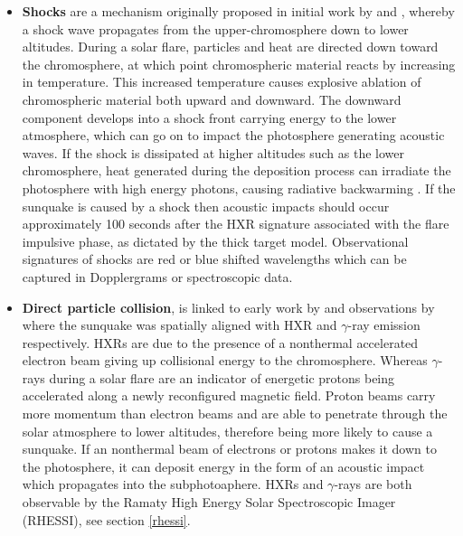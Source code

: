 \begin{itemize}
\item \textbf{Shocks} are a mechanism originally proposed in initial work by \cite{1995ESASP.376b.341K} and \cite{1998Natur.393..317K}, whereby a shock wave propagates from the upper-chromosphere down to lower altitudes. During a solar flare, particles and heat are directed down toward the chromosphere, at which point chromospheric material reacts by increasing in temperature. This increased temperature causes explosive ablation of chromospheric material both upward and downward. The downward component develops into a shock front carrying energy to the lower atmosphere, which can go on to impact the photosphere generating acoustic waves. If the shock is dissipated at higher altitudes such as the lower chromosphere, heat generated during the deposition process can irradiate the photosphere with high energy photons, causing radiative backwarming \citep{1989SoPh..124..303M}. If the sunquake is caused by a shock then acoustic impacts should occur approximately 100 seconds after the HXR signature associated with the flare impulsive phase, as dictated by the thick target model. Observational signatures of shocks are red or blue shifted wavelengths which can be captured in Dopplergrams or spectroscopic data. \\

\item \textbf{Direct particle collision}, is linked to early work by \cite{1998Natur.393..317K} and observations by \cite{2007ApJ...664..573Z} where the sunquake was spatially aligned with HXR and $\gamma$-ray emission respectively. HXRs are due to the presence of a nonthermal accelerated electron beam giving up collisional energy to the chromosphere. Whereas $\gamma$-rays during a solar flare are an indicator of energetic protons being accelerated along a newly reconfigured magnetic field. Proton beams carry more momentum than electron beams and are able to penetrate through the solar atmosphere to lower altitudes, therefore being more likely to cause a sunquake. If an nonthermal beam of electrons or protons makes it down to the photosphere, it can deposit energy in the form of an acoustic impact which propagates into the subphotoaphere. HXRs and $\gamma$-rays are both observable by the Ramaty High Energy Solar Spectroscopic Imager (RHESSI), see section \ref{rhessi}. \\

\end{itemize}


